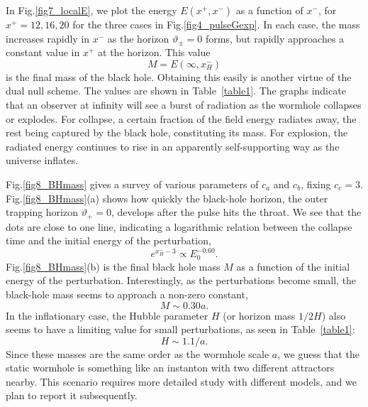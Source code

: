 \documentclass[aps,showpacs,twocolumn,draft,eqsecnum]{revtex4}
\begin{document}
In Fig.\ref{fig7_localE}, we plot the energy $E(x^+,x^-)$ as a function of
$x^-$, for  $x^+ = 12,16,20$ for the three cases in  Fig.\ref{fig4_pulseGexp}.
In each case, the mass increases rapidly in $x^-$ as the horizon
$\vartheta_\pm=0$ forms, but rapidly approaches a constant value in $x^+$ at
the horizon. This value
\begin{equation}
M=E(\infty,x^-_H)
\end{equation}
is the final mass of the black hole. Obtaining this easily is another virtue of
the dual null scheme. The values are shown in Table~\ref{table1}. The graphs
indicate that an observer at infinity will see a burst of radiation as the
wormhole collapses or explodes. For collapse, a certain fraction of the field
energy radiates away, the rest being captured by the black hole, constituting
its mass. For explosion, the radiated energy continues to rise in an apparently
self-supporting way as the universe inflates.

Fig.\ref{fig8_BHmass} gives a survey of various parameters of $c_a$ and $c_b$,
fixing $c_c=3$. Fig.\ref{fig8_BHmass}(a) shows how quickly the black-hole
horizon, the outer trapping horizon $\vartheta_+=0$, develops after the pulse
hits the throat. We see that the dots are close to one line, indicating a
logarithmic relation between the collapse time and the initial energy of the
perturbation,
\begin{equation}
e^{x^-_H-3} \propto E_0^{-0.60}.
\end{equation}
Fig.\ref{fig8_BHmass}(b) is the final black hole mass $M$ as a function of the
initial energy of the perturbation. Interestingly, as the perturbations become
small, the black-hole mass seems to approach a non-zero constant,
\begin{equation}
M\sim 0.30 a.
\end{equation}
In the inflationary case, the Hubble parameter $H$ (or horizon mass $1/2H$)
also seems to have a limiting value for small perturbations, as seen in
Table~\ref{table1}:
\begin{equation}
H\sim1.1/a.
\end{equation}
Since these masses are the same order as the wormhole scale $a$, we guess that
the static wormhole is something like an instanton with two different
attractors nearby. This scenario requires more detailed study with different
models, and we plan to report it subsequently.


\end{document}
